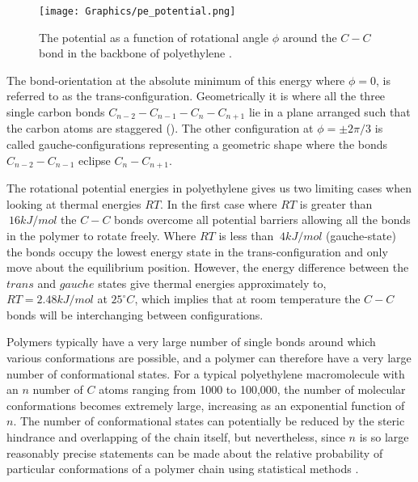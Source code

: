 \begin{figure}[htp]
\centering \texttt{[image: Graphics/pe\_potential.png]}
\caption{The potential as a function of rotational angle $\phi$ around the $C-C$ bond in the backbone of polyethylene \cite{Hiemenz1984}.}
\label{fig:pe_potential_ethane}
\end{figure}

The bond-orientation at the absolute minimum of this energy where $\phi=0$, is referred to as the trans-configuration. Geometrically it is where all the three single carbon bonds $C_{n-2}-C_{n-1}-C_{n}-C_{n+1}$ lie in a plane arranged such that the carbon atoms are staggered (). The other configuration at $\phi= \pm{2\pi/3}$ is called gauche-configurations representing a geometric shape where the bonds $C_{n-2}-C_{n-1}$ eclipse $C_{n}-C_{n+1}$. 

The rotational potential energies in polyethylene gives us two limiting cases when looking at thermal energies $RT$. In the first case where $RT$ is greater than $~16kJ/mol$ the $C-C$ bonds overcome all potential barriers allowing all the bonds in the polymer to rotate freely. Where $RT$ is less than $~4kJ/mol$ (gauche-state) the bonds occupy the lowest energy state in the trans-configuration and only move about the equilibrium position. However, the energy difference between the $trans$ and $gauche$ states give thermal energies approximately to, $RT = 2.48 kJ/mol$ at $25^{\circ}C$, which implies that at room temperature the $C-C$ bonds will be interchanging between configurations.

Polymers typically have a very large number of single bonds around which various conformations are possible, and a polymer can therefore have a very large number of conformational states. For a typical polyethylene macromolecule with an $n$ number of $C$ atoms ranging from 1000 to 100,000, the number of molecular conformations becomes extremely large, increasing as an exponential function of $n$. The number of conformational states can potentially be reduced by the steric hindrance and overlapping of the chain itself, but nevertheless, since $n$ is so large reasonably precise statements can be made about the relative probability of particular conformations of a polymer chain using statistical methods \cite{bower2002}.
